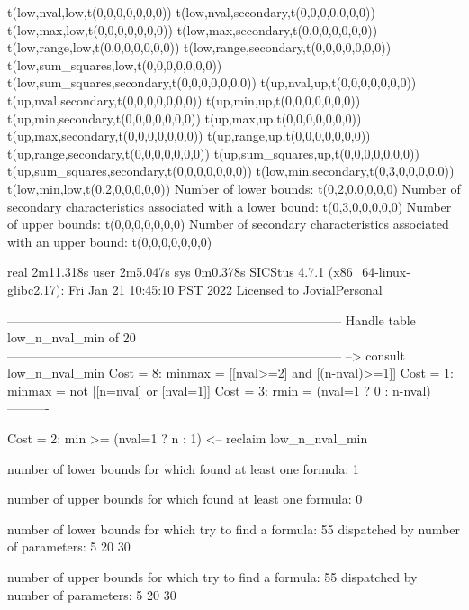 t(low,nval,low,t(0,0,0,0,0,0,0))
t(low,nval,secondary,t(0,0,0,0,0,0,0))
t(low,max,low,t(0,0,0,0,0,0,0))
t(low,max,secondary,t(0,0,0,0,0,0,0))
t(low,range,low,t(0,0,0,0,0,0,0))
t(low,range,secondary,t(0,0,0,0,0,0,0))
t(low,sum_squares,low,t(0,0,0,0,0,0,0))
t(low,sum_squares,secondary,t(0,0,0,0,0,0,0))
t(up,nval,up,t(0,0,0,0,0,0,0))
t(up,nval,secondary,t(0,0,0,0,0,0,0))
t(up,min,up,t(0,0,0,0,0,0,0))
t(up,min,secondary,t(0,0,0,0,0,0,0))
t(up,max,up,t(0,0,0,0,0,0,0))
t(up,max,secondary,t(0,0,0,0,0,0,0))
t(up,range,up,t(0,0,0,0,0,0,0))
t(up,range,secondary,t(0,0,0,0,0,0,0))
t(up,sum_squares,up,t(0,0,0,0,0,0,0))
t(up,sum_squares,secondary,t(0,0,0,0,0,0,0))
t(low,min,secondary,t(0,3,0,0,0,0,0))
t(low,min,low,t(0,2,0,0,0,0,0))
Number of lower bounds:                                             t(0,2,0,0,0,0,0)
Number of secondary characteristics associated with a lower bound:  t(0,3,0,0,0,0,0)
Number of upper bounds:                                             t(0,0,0,0,0,0,0)
Number of secondary characteristics associated with an upper bound: t(0,0,0,0,0,0,0)

real	2m11.318s
user	2m5.047s
sys	0m0.378s
SICStus 4.7.1 (x86_64-linux-glibc2.17): Fri Jan 21 10:45:10 PST 2022
Licensed to JovialPersonal


--------------------------------------------------------------------------------
Handle table low_n_nval_min of 20
--------------------------------------------------------------------------------
--> consult low_n_nval_min
Cost =  8:  minmax = [[nval>=2] and [(n-nval)>=1]]
Cost =  1:  minmax = not [[n=nval] or [nval=1]]
Cost =  3:  rmin   = (nval=1 ? 0 : n-nval)
----------

Cost =  2:  min >= (nval=1 ? n : 1)
<-- reclaim low_n_nval_min

number of lower bounds for which found at least one formula: 1

number of upper bounds for which found at least one formula: 0

number of lower bounds for which try to find a formula: 55
dispatched by number of parameters: 5  20  30

number of upper bounds for which try to find a formula: 55
dispatched by number of parameters: 5  20  30

